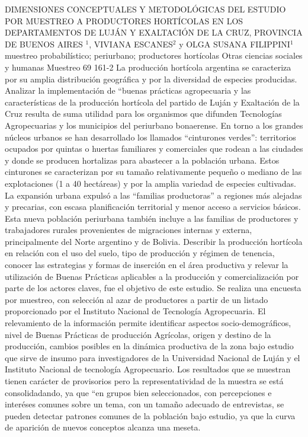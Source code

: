 \A
{DIMENSIONES CONCEPTUALES Y METODOLÓGICAS DEL ESTUDIO POR MUESTREO A PRODUCTORES HORTÍCOLAS EN LOS DEPARTAMENTOS DE LUJÁN Y EXALTACIÓN DE LA CRUZ, PROVINCIA DE BUENOS AIRES}
{$^1$, VIVIANA ESCANES$^2$ y OLGA SUSANA FILIPPINI$^1$}
{
\\}
{muestreo probabilístico; periurbano; productores hortícolas} 
 {Otras ciencias sociales y humanas} 
 {Muestreo} 
 {69} 
 {161-2}
{La producción hortícola argentina se caracteriza por su amplia distribución geográfica y por la diversidad de especies producidas. Analizar la implementación de “buenas prácticas agropecuaria y las características de la producción hortícola del partido de Luján y Exaltación de la Cruz resulta de suma utilidad para los organismos que difunden Tecnologías Agropecuarias y los municipios del periurbano bonaerense. En torno a los grandes núcleos urbanos se han desarrollado los llamados “cinturones verdes”: territorios ocupados por quintas o huertas familiares y comerciales que rodean a las ciudades y donde se producen hortalizas para abastecer a la población urbana. Estos cinturones se caracterizan por su tamaño relativamente pequeño o mediano de las explotaciones (1 a 40 hectáreas) y por la amplia variedad de especies cultivadas. La expansión urbana expulsó a las “familias productoras” a regiones más alejadas y precarias, con escasa planificación territorial y menor acceso a servicios básicos. Esta nueva población periurbana también incluye a las familias de productores y trabajadores rurales provenientes de migraciones internas y externa, principalmente del Norte argentino y de Bolivia. Describir la producción hortícola en relación con el uso del suelo, tipo de producción y régimen de tenencia, conocer las estrategias y formas de inserción en el área productiva y relevar la utilización de Buenas Prácticas aplicables a la producción y comercialización por parte de los actores claves, fue el objetivo de este estudio. Se realiza una encuesta por muestreo, con selección al azar de productores a partir de un listado proporcionado por el Instituto Nacional de Tecnología Agropecuaria. El relevamiento de la información permite identificar aspectos socio-demográficos, nivel de Buenas Prácticas de producción Agrícolas, origen y destino de la producción, cambios posibles en la dinámica productiva de la zona bajo estudio que sirve de insumo para investigadores de la Universidad Nacional de Luján y el Instituto Nacional de tecnología Agropecuario. Los resultados que se muestran tienen carácter de provisorios pero la representatividad de la muestra se está consolidadando, ya que “en grupos bien seleccionados, con percepciones e interéses comunes sobre un tema, con un tamaño adecuado de entrevistas, se pueden detectar patrones comunes de la población bajo estudio, ya que la curva de aparición de nuevos conceptos alcanza una meseta.}
